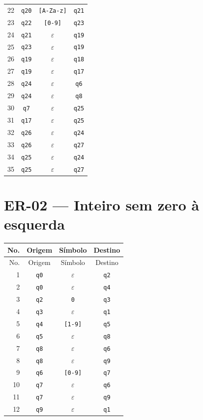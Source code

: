 \begin{longtable}{|r|c|c|c|}
22 & \texttt{q20} & \texttt{[A-Za-z]} & \texttt{q21} \\
23 & \texttt{q22} & \texttt{[0-9]} & \texttt{q23} \\
24 & \texttt{q21} & $\varepsilon$ & \texttt{q19} \\
25 & \texttt{q23} & $\varepsilon$ & \texttt{q19} \\
26 & \texttt{q19} & $\varepsilon$ & \texttt{q18} \\
27 & \texttt{q19} & $\varepsilon$ & \texttt{q17} \\
28 & \texttt{q24} & $\varepsilon$ & \texttt{q6} \\
29 & \texttt{q24} & $\varepsilon$ & \texttt{q8} \\
30 & \texttt{q7} & $\varepsilon$ & \texttt{q25} \\
31 & \texttt{q17} & $\varepsilon$ & \texttt{q25} \\
32 & \texttt{q26} & $\varepsilon$ & \texttt{q24} \\
33 & \texttt{q26} & $\varepsilon$ & \texttt{q27} \\
34 & \texttt{q25} & $\varepsilon$ & \texttt{q24} \\
35 & \texttt{q25} & $\varepsilon$ & \texttt{q27} \\
\bottomrule
\end{longtable}
\section{ER-02 --- Inteiro sem zero à esquerda}
\small
\begin{longtable}{|r|c|c|c|}
\toprule
No. & Origem & Símbolo & Destino \\
\midrule
\endfirsthead
\toprule
No. & Origem & Símbolo & Destino \\
\midrule
\endhead
1 & \texttt{q0} & $\varepsilon$ & \texttt{q2} \\
2 & \texttt{q0} & $\varepsilon$ & \texttt{q4} \\
3 & \texttt{q2} & \texttt{0} & \texttt{q3} \\
4 & \texttt{q3} & $\varepsilon$ & \texttt{q1} \\
5 & \texttt{q4} & \texttt{[1-9]} & \texttt{q5} \\
6 & \texttt{q5} & $\varepsilon$ & \texttt{q8} \\
7 & \texttt{q8} & $\varepsilon$ & \texttt{q6} \\
8 & \texttt{q8} & $\varepsilon$ & \texttt{q9} \\
9 & \texttt{q6} & \texttt{[0-9]} & \texttt{q7} \\
10 & \texttt{q7} & $\varepsilon$ & \texttt{q6} \\
11 & \texttt{q7} & $\varepsilon$ & \texttt{q9} \\
12 & \texttt{q9} & $\varepsilon$ & \texttt{q1} \\
\bottomrule
\end{longtable}
